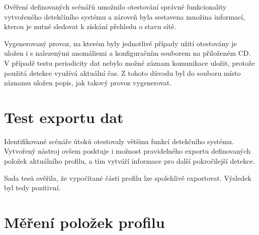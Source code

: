   Ověření definovaných scénářů umožnilo otestování správné funkcionality vytvořeného detekčíního
  systému a zároveň byla sestavena množina informací, kterou je nutné sledovat k získání 
  přehledu o stavu sítě.
  
  Vygenerovaný provoz, na kterém byly jednotlivé případy užití otestovány je uložen i s nalezenými
  anomáliemi a konfiguračním souborem na přiloženém CD. V případě testu periodicity dat nebylo možné záznam 
  komunikace uložit, protože použitá detekce využívá aktuální čas. Z tohoto důvodu 
  byl do souboru místo záznamu uložen popis, jak takový provoz vygenerovat.

\section{Test exportu dat}
Identifikované scénáře útoků otestovaly většinu funkcí detekčního systému. Vytvořený nástroj
ovšem posktuje i možnost pravidelného exportu definovaných položek aktuálního profilu, a tím 
vytváří informace pro další pokročilejší detekce. 

Sada tesů ověřila, že vypočítané části profilu lze spolehlivě exportovat. Výsledek byl tedy
pozitivní.

\section{Měření položek profilu}